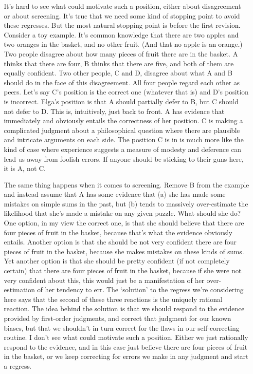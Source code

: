 \documentclass[
  10pt,
  letterpaper,
  twoside]{scrbook}
\begin{document}
It's hard to see what could motivate such a position, either about
disagreement or about screening. It's true that we need some kind of
stopping point to avoid these regresses. But the most natural stopping
point is before the first revision. Consider a toy example. It's common
knowledge that there are two apples and two oranges in the basket, and
no other fruit. (And that no apple is an orange.) Two people disagree
about how many pieces of fruit there are in the basket. A thinks that
there are four, B thinks that there are five, and both of them are
equally confident. Two other people, C and D, disagree about what A and
B should do in the face of this disagreement. All four people regard
each other as peers. Let's say C's position is the correct one (whatever
that is) and D's position is incorrect. Elga's position is that A should
partially defer to B, but C should not defer to D. This is, intuitively,
just back to front. A has evidence that immediately and obviously
entails the correctness of her position. C is making a complicated
judgment about a philosophical question where there are plausible and
intricate arguments on each side. The position C is in is much more like
the kind of case where experience suggests a measure of modesty and
deference can lead us away from foolish errors. If anyone should be
sticking to their guns here, it is A, not C.

The same thing happens when it comes to screening. Remove B from the
example and instead assume that A has some evidence that (a) she has
made some mistakes on simple sums in the past, but (b) tends to
massively over-estimate the likelihood that she's made a mistake on any
given puzzle. What should she do? One option, in my view the correct
one, is that she should believe that there are four pieces of fruit in
the basket, because that's what the evidence obviously entails. Another
option is that she should be not very confident there are four pieces of
fruit in the basket, because she makes mistakes on these kinds of sums.
Yet another option is that she should be pretty confident (if not
completely certain) that there are four pieces of fruit in the basket,
because if she were not very confident about this, this would just be a
manifestation of her over-estimation of her tendency to err. The
`solution' to the regress we're considering here says that the second of
these three reactions is the uniquely rational reaction. The idea behind
the solution is that we should respond to the evidence provided by
first-order judgments, and correct that judgment for our known biases,
but that we shouldn't in turn correct for the flaws in our
self-correcting routine. I don't see what could motivate such a
position. Either we just rationally respond to the evidence, and in this
case just believe there are four pieces of fruit in the basket, or we
keep correcting for errors we make in any judgment and start a regress.
\end{document}
